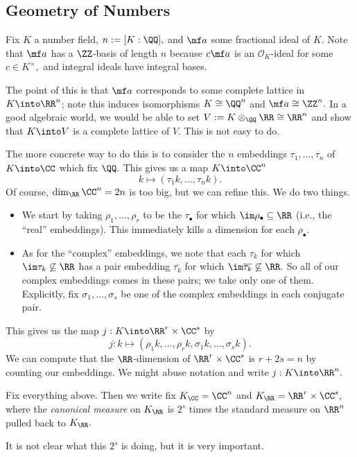 \documentclass[../notes.tex]{subfiles}
\begin{document}
\subsection{Geometry of Numbers}
Fix $K$ a number field, $n:=[K:\QQ],$ and $\mf a$ some fractional ideal of $K.$ Note that $\mf a$ has a $\ZZ$-basis of length $n$ because $c\mf a$ is an $\mathcal O_K$-ideal for some $c\in K^\times,$ and integral ideals have integral bases.

The point of this is that $\mf a$ corresponds to some complete lattice in $K\into\RR^n$; note this induces isomorphisms $K\cong\QQ^n$ and $\mf a\cong\ZZ^n.$ In a good algebraic world, we would be able to set $V:=K\otimes_\QQ\RR\cong\RR^n$ and show that $K\into V$ is a complete lattice of $V.$ This is not easy to do.

The more concrete way to do this is to consider the $n$ embeddings $\tau_1,\ldots,\tau_n$ of $K\into\CC$ which fix $\QQ.$ This gives us a map $K\into\CC^n$
\[k\longmapsto(\tau_1k,\ldots,\tau_nk).\]
Of course, $\dim_\RR\CC^n=2n$ is too big, but we can refine this. We do two things.
\begin{itemize}
    \item We start by taking $\rho_1,\ldots,\rho_r$ to be the $\tau_\bullet$ for which $\im\rho_\bullet\subseteq\RR$ (i.e., the ``real'' embeddings). This immediately kills a dimension for each $\rho_\bullet.$
    \item As for the ``complex'' embeddings, we note that each $\tau_k$ for which $\im\tau_k\not\subseteq\RR$ has a pair embedding $\overline{\tau_k}$ for which $\im\overline{\tau_k}\not\subseteq\RR.$ So all of our complex embeddings comes in these pairs; we take only one of them. Explicitly, fix $\sigma_1,\ldots,\sigma_s$ be one of the complex embeddings in each conjugate pair.
\end{itemize}
This gives us the map $j:K\into\RR^r\times\CC^s$ by
\[j:k\longmapsto(\rho_1k,\ldots,\rho_rk,\sigma_1k,\ldots,\sigma_sk).\]
We can compute that the $\RR$-dimension of $\RR^r\times\CC^s$ is $r+2s=n$ by counting our embeddings. We might abuse notation and write $j:K\into\RR^n.$
\begin{definition}
    Fix everything above. Then we write fix $K_\CC=\CC^n$ and $K_\RR=\RR^r\times\CC^s,$ where the \textit{canonical measure} on $K_\RR$ is $2^s$ times the standard measure on $\RR^n$ pulled back to $K_\RR.$
\end{definition}
It is not clear what this $2^s$ is doing, but it is very important.
\end{document}
